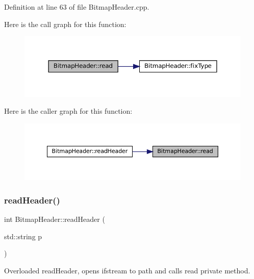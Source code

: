 Definition at line 63 of file Bitmap\+Header.\+cpp.

Here is the call graph for this function\+:
\nopagebreak
\begin{figure}[H]
\begin{center}
\leavevmode
\includegraphics[width=350pt]{classBitmapHeader_a6f91559c339074535445780e99e5f717_cgraph}
\end{center}
\end{figure}
Here is the caller graph for this function\+:
\nopagebreak
\begin{figure}[H]
\begin{center}
\leavevmode
\includegraphics[width=350pt]{classBitmapHeader_a6f91559c339074535445780e99e5f717_icgraph}
\end{center}
\end{figure}
\mbox{\label{classBitmapHeader_a2de360d5111136167f5885bed561bc8c}} 
\subsubsection{\texorpdfstring{readHeader()}{readHeader()}\hspace{0.1cm}{\footnotesize\ttfamily [1/2]}}
{\footnotesize\ttfamily int Bitmap\+Header\+::read\+Header (\begin{DoxyParamCaption}\item[{std\+::string}]{p }\end{DoxyParamCaption})}



Overloaded read\+Header, opens ifstream to path and calls read private method. 




